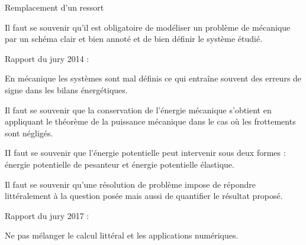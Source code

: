 \begin{exo}[PC][1][oral]{Remplacement d'un ressort}
{\begin{liste}
  \item[
  $\checkmark$] Il faut se souvenir qu'il est obligatoire de modéliser un problème de mécanique par un schéma clair et bien annoté et de bien définir le système étudié.
  
  Rapport du jury 2014 :
  
  En mécanique les systèmes sont mal définis ce qui entraîne souvent des erreurs de signe dans les bilans énergétiques.
  
  \item[$\checkmark$] Il faut se souvenir que la conservation de l'énergie mécanique s'obtient en appliquant le théorème de la puissance mécanique dans le cas où les frottements sont négligés.
  
  II faut se souvenir que l'énergie potentielle peut intervenir sous deux formes : énergie potentielle de pesanteur et énergie potentielle élastique.
  
  \item[$\checkmark$] Il faut se souvenir qu'une résolution de problème impose de répondre littéralement à la question posée mais aussi de quantifier le résultat proposé.
  
  Rapport du jury 2017 :
  
  Ne pas mélanger le calcul littéral et les applications numériques.
\end{liste}
}
\end{exo}

